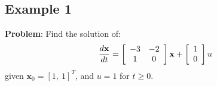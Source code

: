  

\ifslidesonly
\begin{slide}
   
\end{slide}
\fi

 

\ifslidesonly
\begin{slide}
   
\end{slide}
\fi



\ifslidesonly
\begin{slide}
   
\end{slide}
\fi


 
\subsection*{Example 1}

\textbf{Problem}: Find the solution of:
\[
\frac{{d{\bf{x}}}}{{dt}} = \left[ {\begin{array}{*{20}c}
   { - 3} & { - 2}  \\
   1 & 0  \\
\end{array}} \right]{\bf{x}} + \left[ {\begin{array}{*{20}c}
   1  \\
   0  \\
\end{array}} \right]u
\]
given $\mathbf{x}_0=[1,\ 1]^T$, and $u = 1$ for $t\ge 0$.

